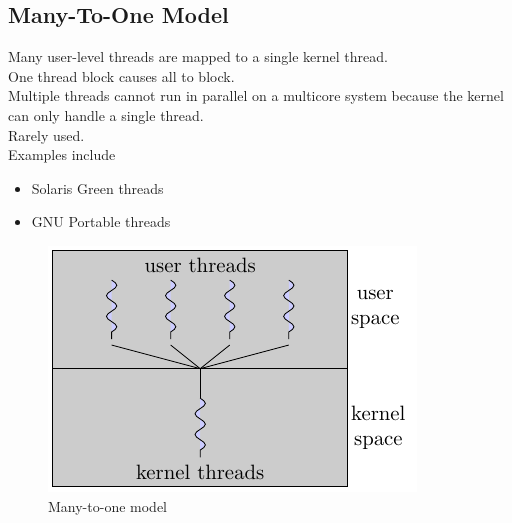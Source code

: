 \documentclass{book/custombook}
\begin{document}
            \subsection{Many-To-One Model}
                Many user-level threads are mapped to a single kernel thread.\\
                One thread block causes all to block.\\
                Multiple threads cannot run in parallel on a multicore system because the kernel can only handle a single thread.\\
                Rarely used.\\
                Examples include
                \begin{itemize}
                    \item Solaris Green threads
                    \item GNU Portable threads
                \end{itemize}
                \begin{figure}[H]
                    \centering
                    \includegraphics{figures/many_to_one.pdf}
                    \caption{Many-to-one model}
                \end{figure}
\end{document}

